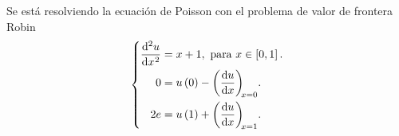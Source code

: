 \begin{solution}
      Se está resolviendo la ecuación de Poisson con el
      problema de valor de frontera Robin
      \begin{equation}\label{eq:poisson1drobindconditions2}
            \left\{
            \begin{aligned}
                  \diff[2]{u}{x}
                   & =x+1,
                  \text{ para }x\in\left[0,1\right].     \\
                  0
                   & = u\left(0\right)-\diff{u}{x}[x=0]. \\
                  2e
                   & =u\left(1\right)+\diff{u}{x}[x=1].  \\
            \end{aligned}
            \right.
      \end{equation}


\end{solution}
